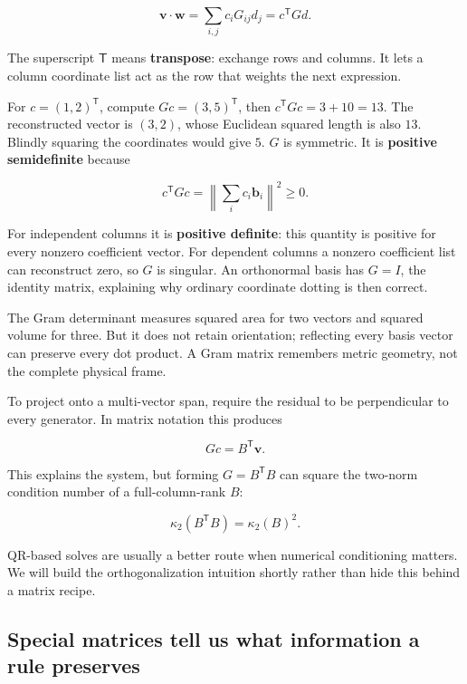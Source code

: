 \[
\mathbf v\cdot\mathbf w
=\sum_{i,j}c_iG_{ij}d_j=c^\mathsf TGd.
\]

The superscript \(\mathsf T\) means \textbf{transpose}: exchange rows and columns. It lets a column coordinate list act as the row that weights the next expression.

For \(c=(1,2)^\mathsf T\), compute \(Gc=(3,5)^\mathsf T\), then \(c^\mathsf TGc=3+10=13\). The reconstructed vector is \((3,2)\), whose Euclidean squared length is also \(13\). Blindly squaring the coordinates would give \(5\). \(G\) is symmetric. It is \textbf{positive semidefinite} because

\[
c^\mathsf TGc=\left\|\sum_i c_i\mathbf b_i\right\|^2\ge0.
\]

For independent columns it is \textbf{positive definite}: this quantity is positive for every nonzero coefficient vector. For dependent columns a nonzero coefficient list can reconstruct zero, so \(G\) is singular. An orthonormal basis has \(G=I\), the identity matrix, explaining why ordinary coordinate dotting is then correct.

The Gram determinant measures squared area for two vectors and squared volume for three. But it does not retain orientation; reflecting every basis vector can preserve every dot product. A Gram matrix remembers metric geometry, not the complete physical frame.

To project onto a multi-vector span, require the residual to be perpendicular to every generator. In matrix notation this produces

\[
Gc=B^\mathsf T\mathbf v.
\]

This explains the system, but forming \(G=B^\mathsf TB\) can square the two-norm condition number of a full-column-rank \(B\):

\[
\kappa_2(B^\mathsf TB)=\kappa_2(B)^2.
\]

QR-based solves are usually a better route when numerical conditioning matters. We will build the orthogonalization intuition shortly rather than hide this behind a matrix recipe.

\subsection{Special matrices tell us what information a rule preserves}\label{01-foundations-i-ch018-special-matrices-tell-us-what-information-a-rule-preserves}

\hypertarget{01-foundations-i-ch018-special-matrices-tell-us-what-information-a-rule-preserves}{}

